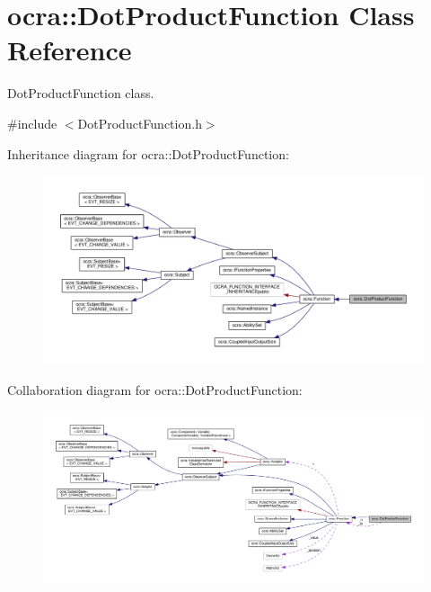 \hypertarget{classocra_1_1DotProductFunction}{}\section{ocra\+:\+:Dot\+Product\+Function Class Reference}
\label{classocra_1_1DotProductFunction}


Dot\+Product\+Function class.  




{\ttfamily \#include $<$Dot\+Product\+Function.\+h$>$}



Inheritance diagram for ocra\+:\+:Dot\+Product\+Function\+:
\nopagebreak
\begin{figure}[H]
\begin{center}
\leavevmode
\includegraphics[width=350pt]{d7/db6/classocra_1_1DotProductFunction__inherit__graph}
\end{center}
\end{figure}


Collaboration diagram for ocra\+:\+:Dot\+Product\+Function\+:
\nopagebreak
\begin{figure}[H]
\begin{center}
\leavevmode
\includegraphics[width=350pt]{d1/dab/classocra_1_1DotProductFunction__coll__graph}
\end{center}
\end{figure}

